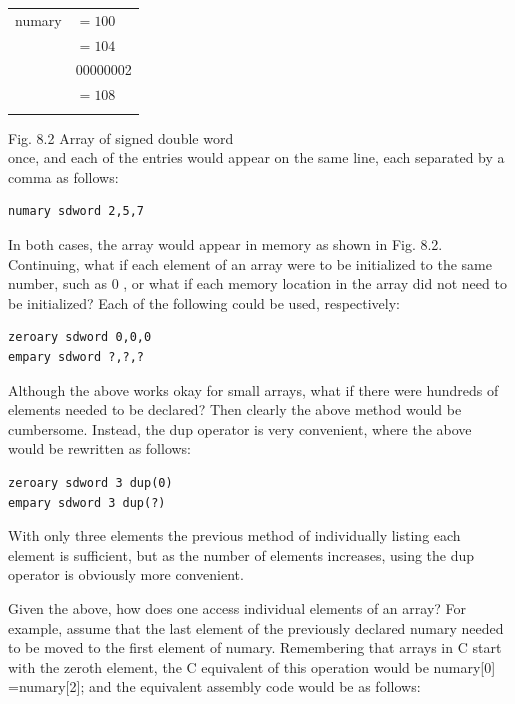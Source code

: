 \documentclass[10pt]{article}
\begin{document}
\begin{center}
\begin{tabular}{rl|}
numary & $=100$ \\
 & $=104$ \\
 & 00000002 \\
 & $=108$ \\
 &  \\
\end{tabular}
\end{center}

Fig. 8.2 Array of signed double word\\
once, and each of the entries would appear on the same line, each separated by a comma as follows:

\begin{verbatim}
numary sdword 2,5,7
\end{verbatim}

In both cases, the array would appear in memory as shown in Fig. 8.2.\\
Continuing, what if each element of an array were to be initialized to the same number, such as 0 , or what if each memory location in the array did not need to be initialized? Each of the following could be used, respectively:

\begin{verbatim}
zeroary sdword 0,0,0
empary sdword ?,?,?
\end{verbatim}

Although the above works okay for small arrays, what if there were hundreds of elements needed to be declared? Then clearly the above method would be cumbersome. Instead, the dup operator is very convenient, where the above would be rewritten as follows:

\begin{verbatim}
zeroary sdword 3 dup(0)
empary sdword 3 dup(?)
\end{verbatim}

With only three elements the previous method of individually listing each element is sufficient, but as the number of elements increases, using the dup operator is obviously more convenient.

Given the above, how does one access individual elements of an array? For example, assume that the last element of the previously declared numary needed to be moved to the first element of numary. Remembering that arrays in C start with the zeroth element, the C equivalent of this operation would be numary[0] =numary[2]; and the equivalent assembly code would be as follows:
\end{document}
